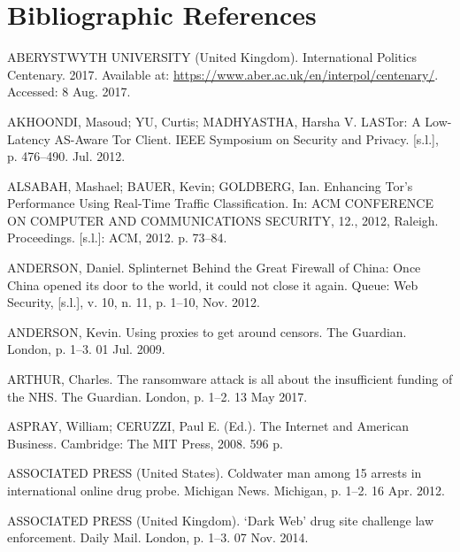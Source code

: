 \chapter*{Bibliographic References}

\begin{list}{}{\setlength{\leftmargin}{0pt}\setlength{\itemsep}{6pt}\setlength{\parsep}{0pt}}

\item ABERYSTWYTH UNIVERSITY (United Kingdom). International Politics Centenary. 2017. Available at: \url{https://www.aber.ac.uk/en/interpol/centenary/}. Accessed: 8 Aug. 2017.

\item AKHOONDI, Masoud; YU, Curtis; MADHYASTHA, Harsha V. LASTor: A Low-Latency AS-Aware Tor Client. IEEE Symposium on Security and Privacy. [s.l.], p. 476--490. Jul. 2012.

\item ALSABAH, Mashael; BAUER, Kevin; GOLDBERG, Ian. Enhancing Tor's Performance Using Real-Time Traffic Classification. In: ACM CONFERENCE ON COMPUTER AND COMMUNICATIONS SECURITY, 12., 2012, Raleigh. Proceedings. [s.l.]: ACM, 2012. p. 73--84.

\item ANDERSON, Daniel. Splinternet Behind the Great Firewall of China: Once China opened its door to the world, it could not close it again. Queue: Web Security, [s.l.], v. 10, n. 11, p. 1--10, Nov. 2012.

\item ANDERSON, Kevin. Using proxies to get around censors. The Guardian. London, p. 1--3. 01 Jul. 2009.

\item ARTHUR, Charles. The ransomware attack is all about the insufficient funding of the NHS. The Guardian. London, p. 1--2. 13 May 2017.

\item ASPRAY, William; CERUZZI, Paul E. (Ed.). The Internet and American Business. Cambridge: The MIT Press, 2008. 596 p.

\item ASSOCIATED PRESS (United States). Coldwater man among 15 arrests in international online drug probe. Michigan News. Michigan, p. 1--2. 16 Apr. 2012.

\item ASSOCIATED PRESS (United Kingdom). `Dark Web' drug site challenge law enforcement. Daily Mail. London, p. 1--3. 07 Nov. 2014.


\end{list}
